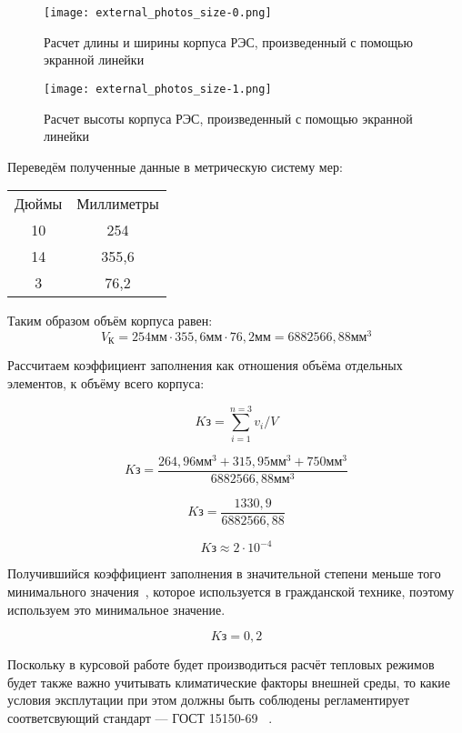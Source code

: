 \begin{figure}[h]
  \centering
  \texttt{[image: external\_photos\_size-0.png]}
  \caption{Расчет длины и ширины корпуса РЭС, произведенный с помощью
экранной линейки}
\end{figure}



\begin{figure}[h]
  \centering
  \texttt{[image: external\_photos\_size-1.png]}
  \caption{Расчет высоты корпуса РЭС, произведенный с помощью
экранной линейки}
\end{figure}
\newpage


\begin{table}
Переведём полученные данные в метрическую систему мер:\\
  \centering
\begin{tabular}[b]{c | c}

  \hline
  Дюймы & Миллиметры \\ 
  10    & 254 \\
  14    & 355,6 \\
  3     & 76,2 \\
  \hline

\end{tabular}
\end{table}

Таким образом объём корпуса равен:
$$V\mathrm{_К} = 254 \mathrm{мм} \cdot 355,6 \mathrm{мм} \cdot 76,2 \mathrm{мм} = 6882 566,88 \mathrm{мм^3}$$

Рассчитаем коэффициент заполнения как отношения объёма отдельных элементов, к объёму всего корпуса:

$$ K\mathrm{з} = \sum^{n=3}_{i=1} v_{i}/V$$

$$K\mathrm{з} = \frac{264,96 \mathrm{мм}^3 + 315,95 \mathrm{мм}^3 + 750 \mathrm{мм}^3}{6882 566,88 \mathrm{мм^3}} $$

$$K\mathrm{з} = \frac{1 330,9}{6882 566,88}$$

$$K\mathrm{з} \approx 2 \cdot 10^{-4}$$

Получившийся коэффициент заполнения в значительной степени меньше того
минимального значения~\cite{KP-POIMFP}, которое используется в
гражданской технике, поэтому используем это минимальное значение.

$$K\mathrm{з} = 0,2$$


Поскольку в курсовой работе будет производиться расчёт тепловых
режимов будет также важно учитывать климатические факторы внешней
среды, то какие условия эксплутации при этом должны быть соблюдены
регламентирует соответсвующий стандарт — ГОСТ 15150-69
~\cite{GOST-15150-69}.

